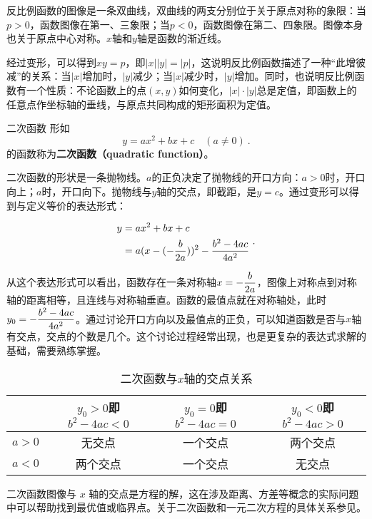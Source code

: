 反比例函数的图像是一条双曲线，双曲线的两支分别位于关于原点对称的象限：当$p>0$，函数图像在第一、三象限；当$p<0$，函数图像在第二、四象限。图像本身也关于原点中心对称。$x$轴和$y$轴是函数的渐近线。

经过变形，可以得到$xy=p$，即$|x||y|=|p|$，这说明反比例函数描述了一种“此增彼减”的关系：当$|x|$增加时，$|y|$减少；当$|x|$减少时，$|y|$增加。同时，也说明反比例函数有一个性质：不论函数上的点$(x,y)$如何变化，$|x|\cdot|y|$总是定值，即函数上的任意点作坐标轴的垂线，与原点共同构成的矩形面积为定值。

\begin{definition}{二次函数}
形如
\begin{equation}
y = ax^2 + bx + c\quad(a\neq0)~.
\end{equation}
的函数称为\textbf{二次函数（quadratic function）}。
\end{definition}

二次函数的形状是一条抛物线。$a$的正负决定了抛物线的开口方向：$a>0$时，开口向上；$a$时，开口向下。抛物线与$y$轴的交点，即截距，是$y=c$。通过变形可以得到与定义等价的表达形式：

\begin{equation}
\begin{split}
y &= ax^2 + bx + c\\
&=a(x-(-{b\over2a}))^2-{b^2-4ac\over4a^2}
\end{split}~.
\end{equation}

从这个表达形式可以看出，函数存在一条对称轴$\displaystyle x=-{b\over 2a}$，图像上对称点到对称轴的距离相等，且连线与对称轴垂直。函数的最值点就在对称轴处，此时$\displaystyle y_0=-{b^2-4ac\over4a^2}$。通过讨论开口方向以及最值点的正负，可以知道函数是否与$x$轴有交点，交点的个数是几个。这个讨论过程经常出现，也是更复杂的表达式求解的基础，需要熟练掌握。

\begin{table}[ht]
\centering
\caption{二次函数与$x$轴的交点关系}\label{tab_HsFunB1}
\begin{tabular}{|c|c|c|c|}
\hline
& $y_0>0$即$b^2-4ac<0$ & $y_0=0$即$b^2-4ac=0$ & $y_0<0$即$b^2-4ac>0$ \\
\hline
$a>0$ & 无交点 & 一个交点 & 两个交点 \\
\hline
$a<0$ & 两个交点 &一个交点&无交点 \\
\hline
\end{tabular}
\end{table}

二次函数图像与 $x$ 轴的交点是方程的解，这在涉及距离、方差等概念的实际问题中可以帮助找到最优值或临界点。关于二次函数和一元二次方程的具体关系参见。
